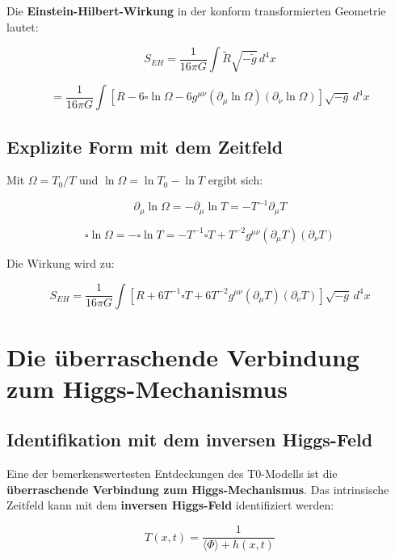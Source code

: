 \documentclass[12pt,a4paper]{report}
\begin{document}
Die \textbf{Einstein-Hilbert-Wirkung} in der konform transformierten Geometrie lautet:

\begin{equation}
	S_{EH} = \frac{1}{16\pi G} \int \tilde{R} \sqrt{-\tilde{g}} \, d^4x
\end{equation}

\begin{equation}
	= \frac{1}{16\pi G} \int [R - 6\square\ln \Omega - 6g^{\mu\nu}(\partial_\mu \ln \Omega)(\partial_\nu \ln \Omega)] \sqrt{-g} \, d^4x
\end{equation}

\subsection{Explizite Form mit dem Zeitfeld}

Mit $\Omega = T_0/T$ und $\ln \Omega = \ln T_0 - \ln T$ ergibt sich:

\begin{equation}
	\partial_\mu \ln \Omega = -\partial_\mu \ln T = -T^{-1}\partial_\mu T
\end{equation}

\begin{equation}
	\square\ln \Omega = -\square\ln T = -T^{-1}\square T + T^{-2}g^{\mu\nu}(\partial_\mu T)(\partial_\nu T)
\end{equation}

Die Wirkung wird zu:

\begin{equation}
	S_{EH} = \frac{1}{16\pi G} \int [R + 6T^{-1}\square T + 6T^{-2}g^{\mu\nu}(\partial_\mu T)(\partial_\nu T)] \sqrt{-g} \, d^4x
\end{equation}

\section{Die überraschende Verbindung zum Higgs-Mechanismus}

\subsection{Identifikation mit dem inversen Higgs-Feld}

Eine der bemerkenswertesten Entdeckungen des T0-Modells ist die \textbf{überraschende Verbindung zum Higgs-Mechanismus}. Das intrinsische Zeitfeld kann mit dem \textbf{inversen Higgs-Feld} identifiziert werden:

\begin{equation}
	T(x,t) = \frac{1}{\langle\Phi\rangle + h(x,t)}
\end{equation}
\end{document}
